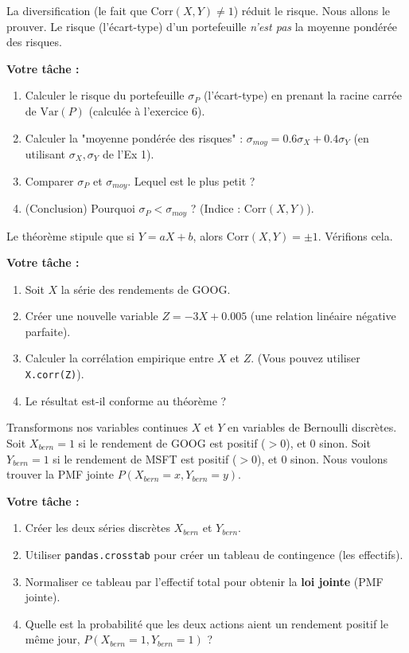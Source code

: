 \begin{exercicebox}
La diversification (le fait que $\text{Corr}(X,Y) \ne 1$) réduit le risque. Nous allons le prouver.
Le risque (l'écart-type) d'un portefeuille \textit{n'est pas} la moyenne pondérée des risques.

\textbf{Votre tâche :}
\begin{enumerate}
    \item Calculer le risque du portefeuille $\sigma_P$ (l'écart-type) en prenant la racine carrée de $\text{Var}(P)$ (calculée à l'exercice 6).
    \item Calculer la "moyenne pondérée des risques" : $\sigma_{moy} = 0.6 \sigma_X + 0.4 \sigma_Y$ (en utilisant $\sigma_X, \sigma_Y$ de l'Ex 1).
    \item Comparer $\sigma_P$ et $\sigma_{moy}$. Lequel est le plus petit ?
    \item (Conclusion) Pourquoi $\sigma_P < \sigma_{moy}$ ? (Indice : $\text{Corr}(X,Y)$).
\end{enumerate}
\end{exercicebox}

\begin{exercicebox}
Le théorème stipule que si $Y = aX + b$, alors $\text{Corr}(X,Y) = \pm 1$. Vérifions cela.

\textbf{Votre tâche :}
\begin{enumerate}
    \item Soit $X$ la série des rendements de GOOG.
    \item Créer une nouvelle variable $Z = -3X + 0.005$ (une relation linéaire négative parfaite).
    \item Calculer la corrélation empirique entre $X$ et $Z$. (Vous pouvez utiliser \texttt{X.corr(Z)}).
    \item Le résultat est-il conforme au théorème ?
\end{enumerate}
\end{exercicebox}

\begin{exercicebox}
Transformons nos variables continues $X$ et $Y$ en variables de Bernoulli discrètes.
Soit $X_{bern} = 1$ si le rendement de GOOG est positif ($> 0$), et $0$ sinon.
Soit $Y_{bern} = 1$ si le rendement de MSFT est positif ($> 0$), et $0$ sinon.
Nous voulons trouver la PMF jointe $P(X_{bern}=x, Y_{bern}=y)$.

\textbf{Votre tâche :}
\begin{enumerate}
    \item Créer les deux séries discrètes $X_{bern}$ et $Y_{bern}$.
    \item Utiliser \texttt{pandas.crosstab} pour créer un tableau de contingence (les effectifs).
    \item Normaliser ce tableau par l'effectif total pour obtenir la \textbf{loi jointe} (PMF jointe).
    \item Quelle est la probabilité que les deux actions aient un rendement positif le même jour, $P(X_{bern}=1, Y_{bern}=1)$ ?
\end{enumerate}
\end{exercicebox}

